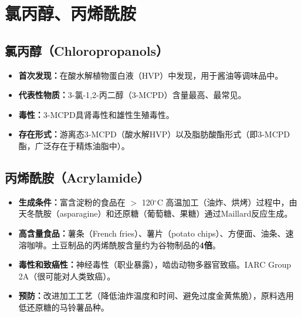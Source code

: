 \section{氯丙醇、丙烯酰胺}

\subsection{氯丙醇（Chloropropanols）}

\begin{defbox}
\begin{itemize}[leftmargin=*]
    \item \textbf{首次发现：}在酸水解植物蛋白液（HVP）中发现，用于酱油等调味品中。
    \item \textbf{代表性物质：}3-氯-1,2-丙二醇（3-MCPD）含量最高、最常见。
    \item \textbf{毒性：}3-MCPD具肾毒性和雄性生殖毒性。
    \item \textbf{存在形式：}游离态3-MCPD（酸水解HVP）以及脂肪酸酯形式（即3-MCPD酯，广泛存在于精炼油脂中）。
\end{itemize}
\end{defbox}

\subsection{丙烯酰胺（Acrylamide）}

\begin{defbox}
\begin{itemize}[leftmargin=*]
    \item \textbf{生成条件：}富含淀粉的食品在 $>$ 120$^\circ$C 高温加工（油炸、烘烤）过程中，由天冬酰胺（asparagine）和还原糖（葡萄糖、果糖）通过Maillard反应生成。
    \item \textbf{高含量食品：}薯条（French fries）、薯片（potato chips）、方便面、油条、速溶咖啡。土豆制品的丙烯酰胺含量约为谷物制品的\textbf{4倍}。
    \item \textbf{毒性和致癌性：}神经毒性（职业暴露），啮齿动物多器官致癌。IARC Group 2A（很可能对人类致癌）。
    \item \textbf{预防：}改进加工工艺（降低油炸温度和时间、避免过度金黄焦脆），原料选用低还原糖的马铃薯品种。
\end{itemize}
\end{defbox}

